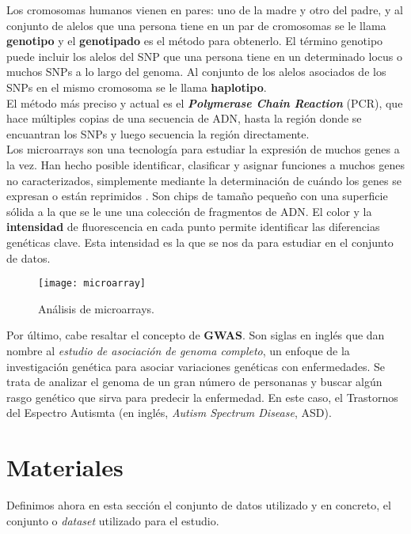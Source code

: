 Los cromosomas humanos vienen en pares: uno de la madre y otro del padre, y al conjunto de alelos que una persona tiene en un par de cromosomas se le llama \textbf{genotipo} y el \textbf{genotipado} es el método para obtenerlo. El término genotipo puede incluir los alelos del SNP que una persona tiene en un determinado locus o muchos SNPs a lo largo del genoma. Al conjunto de los alelos asociados de los SNPs en el mismo cromosoma se le llama \textbf{haplotipo}.\\
El método más preciso y actual es el \textbf{\textit{Polymerase Chain Reaction}} (PCR), que hace múltiples copias de una secuencia de ADN, hasta la región donde se encuantran los SNPs y luego secuencia la región directamente.\\

Los microarrays son una tecnología para estudiar la expresión de muchos genes a la vez. Han hecho posible identificar, clasificar y asignar funciones a muchos genes no caracterizados, simplemente mediante la determinación de cuándo los genes se expresan o están reprimidos  \cite{microarray}. Son chips de tamaño pequeño con una superficie sólida a la que se le une una colección de fragmentos de ADN. El color y la \textbf{intensidad} de fluorescencia en cada punto permite identificar las diferencias genéticas clave. Esta intensidad es la que se nos da para estudiar en el conjunto de datos.

\begin{figure}[H]
  \centering
  \texttt{[image: microarray]}
  \caption{Análisis de microarrays. \cite{microarray}}
  \label{fig:overfit}
\end{figure}
\begin{center}
\end{center}

Por último, cabe resaltar el concepto de \textbf{GWAS}. Son siglas en inglés que dan nombre al \textit{estudio de asociación de genoma completo}, un enfoque de la investigación genética para asociar variaciones genéticas con enfermedades. Se trata de analizar el genoma de un gran número de personanas y buscar algún rasgo genético que sirva para predecir la enfermedad. En este caso, el Trastornos del Espectro Autismta (en inglés, \textit{Autism Spectrum Disease}, ASD).

\section{Materiales}\label{st:Materiales}
Definimos ahora en esta sección el conjunto de datos utilizado y en concreto, el conjunto o \textit{dataset} utilizado para el estudio.
